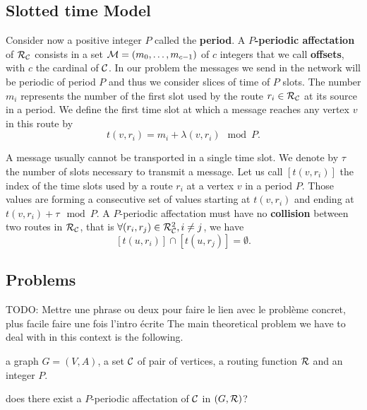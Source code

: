 \documentclass[a4paper,10pt]{article}
\newcommand{\todo}[1]{{\color{red} TODO: {#1}}}
\begin{document}
   \subsection{Slotted time Model}
      Consider now a positive integer $P$ called the {\bf period}. A {\bf $P$-periodic affectation} of $\cal R_{\cal C}$ consists in a set  ${\cal M}=(m_0, \ldots ,m_{c-1})$
      of $c$ integers that we call {\bf offsets}, with $c$ the cardinal of $\cal C$. In our problem the messages we send in the network will be periodic of period $P$ and thus we consider slices of time of $P$ slots. 
      The number $m_i$ represents the number of the first slot used by the route $r_i \in {\cal R}_{\cal C}$ at its source in a period.
      We define the first time slot at which a message reaches any vertex $v$ in this route by $$t(v,r_i) = m_i+\lambda(v,r_i) \mod P.$$

      A message usually cannot be transported in a single time slot. We denote by $\tau$ the number 
      of slots necessary to transmit a message. %
      Let us call $[t(v,r_i)]$ the index of the time slots used by a route $r_i$ at a vertex $v$ in a period $P$. Those values are forming a consecutive set of values starting at $t(v,r_i)$ and ending at $t(v,r_i) + \tau \mod P$. A $P$-periodic affectation must have no {\bf collision} between two routes in ${\cal R}_{\cal C}$, that is $\forall (r_i, r_j) \in {\cal R}_{\cal C}^2, i \neq j$, %
      we have $$[t(u,r_i)] \cap [t(u,r_j)] = \emptyset .$$
      
   \subsection{Problems}

   \todo{Mettre une phrase ou deux pour faire le lien avec le problème concret, plus facile  faire une fois l'intro écrite}
      The main theoretical problem we have to deal with in this context is the following.\\


       a graph $G=(V,A)$, a set $\cal C$ of pair of vertices, a routing function $\cal R$ and an integer $P$.

       does there exist a $P$-periodic affectation of $\cal C$ in $(G,{\cal R})$?
\end{document}
